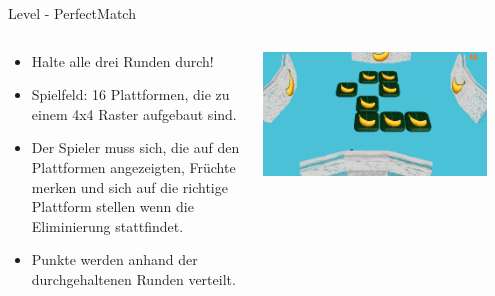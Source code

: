 \documentclass[xcolor=dvipsnames]{beamer}
\begin{document}
\begin{frame}{Level - PerfectMatch}
\begin{columns}
\begin{column}{0.5\textwidth}
	\begin{itemize}
		\item Halte alle drei Runden durch!
		\item Spielfeld: 16 Plattformen, die zu einem 4x4 Raster aufgebaut sind.
		\item Der Spieler muss sich, die auf den Plattformen angezeigten, Früchte merken und sich auf die richtige Plattform stellen wenn die Eliminierung stattfindet.
		\item Punkte werden anhand der durchgehaltenen Runden verteilt.
	\end{itemize}
\end{column}
\begin{column}{0.5\textwidth} 
	\begin{center}
		\includegraphics[width=0.9\textwidth]{perfectmatchpic.png}
	\end{center}
\end{column}
\end{columns}
\end{frame}
\end{document}
